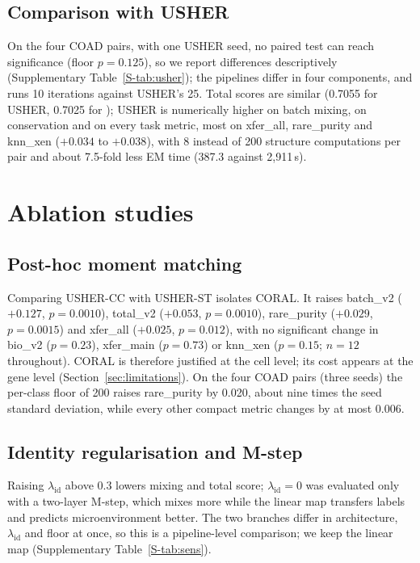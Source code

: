 \subsection{Comparison with USHER}\label{sec:res_usher}
On the four COAD pairs, with one USHER seed, no paired test can reach significance (floor $p=0.125$), so we report
differences descriptively (Supplementary Table~\ref{S-tab:usher}); the pipelines differ in four components, and
\frost runs 10 iterations against USHER's 25. Total scores are similar (0.7055 for USHER, 0.7025
for \frost); USHER is numerically higher on batch mixing, \frost on conservation and on every task metric, most on
xfer\_all, rare\_purity and knn\_xen ($+0.034$ to $+0.038$), with 8 instead of 200 structure computations per pair and
about 7.5-fold less EM time (387.3 against 2{,}911\,s).

\section{Ablation studies}\label{sec:res_ablation}
\subsection{Post-hoc moment matching}\label{sec:res_coral}
Comparing USHER-CC with USHER-ST isolates CORAL. It raises batch\_v2 ($+0.127$, $p=0.0010$), total\_v2 ($+0.053$,
$p=0.0010$), rare\_purity ($+0.029$, $p=0.0015$) and xfer\_all ($+0.025$, $p=0.012$), with no significant change
in bio\_v2 ($p=0.23$), xfer\_main ($p=0.73$) or knn\_xen ($p=0.15$; $n=12$ throughout). CORAL is therefore justified at the cell level;
its cost appears at the gene level (Section~\ref{sec:limitations}). On the four COAD pairs (three seeds) the
per-class floor of 200 raises rare\_purity by 0.020, about nine times the seed standard deviation, while every other
compact metric changes by at most 0.006.

\subsection{Identity regularisation and M-step}\label{sec:res_mstep}
Raising $\lambda_{\mathrm{id}}$ above 0.3 lowers mixing and total score; $\lambda_{\mathrm{id}}=0$ was evaluated
only with a two-layer M-step, which mixes more while the linear map transfers labels and predicts microenvironment
better. The two branches differ in architecture, $\lambda_{\mathrm{id}}$ and floor at once, so this is a
pipeline-level comparison; we keep the linear map (Supplementary Table~\ref{S-tab:sens}).

